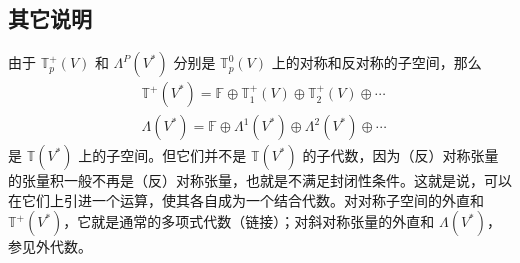 \subsection{其它说明}
由于 $\mathbb T_p^+(V)$ 和 $\Lambda^P(V^*)$ 分别是 $\mathbb T_p^0(V)$ 上的对称和反对称的子空间，那么
\begin{equation}
\begin{aligned}
&\mathbb T^+(V^*)=\mathbb F\oplus\mathbb T_1^+(V)\oplus\mathbb T_2^+(V)\oplus\cdots\\
&\Lambda(V^*)=\mathbb F\oplus \Lambda^1(V^*)\oplus\Lambda^2(V^*)\oplus\cdots
\end{aligned}~
\end{equation}
是 $\mathbb T(V^*)$ 上的子空间。但它们并不是 $\mathbb T(V^*)$ 的子代数，因为（反）对称张量的张量积一般不再是（反）对称张量，也就是不满足封闭性条件。这就是说，可以在它们上引进一个运算，使其各自成为一个结合代数。对对称子空间的外直和 $\mathbb T^+(V^*)$，它就是通常的多项式代数（链接）；对斜对称张量的外直和 $\Lambda(V^*)$，参见外代数。
